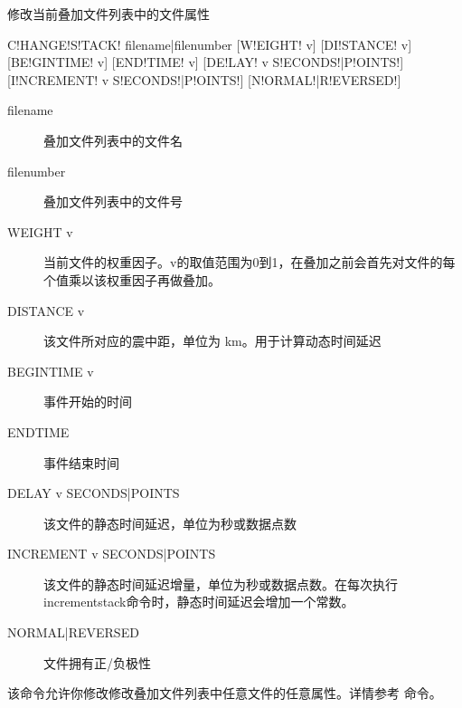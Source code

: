 \label{sss:changestack}

修改当前叠加文件列表中的文件属性

\begin{SACSTX}
C!HANGE!S!TACK! filename|filenumber [W!EIGHT! v] [DI!STANCE! v] [BE!GINTIME! v]
    [END!TIME! v] [DE!LAY! v S!ECONDS!|P!OINTS!] [I!NCREMENT! v S!ECONDS!|P!OINTS!]
    [N!ORMAL!|R!EVERSED!]
\end{SACSTX}

\begin{description}
\item [filename] 叠加文件列表中的文件名
\item [filenumber] 叠加文件列表中的文件号
\item [WEIGHT v] 当前文件的权重因子。v的取值范围为0到1，在叠加之前会首先对文件的每个值乘以该权重因子再做叠加。
\item [DISTANCE v] 该文件所对应的震中距，单位为 \si{\km}。用于计算动态时间延迟
\item [BEGINTIME v] 事件开始的时间
\item [ENDTIME] 事件结束时间
\item [DELAY v SECONDS|POINTS] 该文件的静态时间延迟，单位为秒或数据点数
\item [INCREMENT v SECONDS|POINTS] 该文件的静态时间延迟增量，单位为秒或数据点数。在每次执行incrementstack命令时，静态时间延迟会增加一个常数。
\item [NORMAL|REVERSED] 文件拥有正/负极性
\end{description}

该命令允许你修改修改叠加文件列表中任意文件的任意属性。详情参考  命令。

